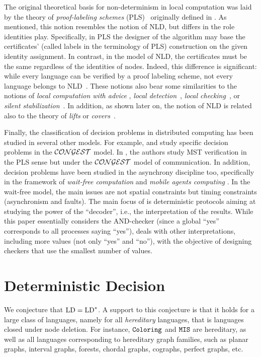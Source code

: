 \documentclass{llncs}
\newcommand{\LD}{\mbox{\rm LD}}
\newcommand{\coloring}{\mbox{\tt Coloring}}
\newcommand{\mis}{\mbox{\tt MIS}}
\begin{document}
The original theoretical basis for non-determinism in local
computation was laid by the theory of \emph{proof-labeling schemes} (PLS)~\cite{GS11,KK07,KKM11,KKP10} 
originally defined in \cite{KKP10}. As mentioned, 
this notion resembles the notion of NLD, but differs in the role identities play. Specifically, in PLS the designer of the algorithm may base the certificates'
(called labels in the terminology of PLS) construction on the given identity assignment. In contrast, in the model of NLD, the certificates must be the same regardless of the identities of nodes.
Indeed, this difference is significant: while every language can be verified by a proof labeling scheme, not every language belongs to NLD~\cite{FKP11}. These notions also bear some similarities to the notions of \emph{local computation with advice} \cite{DP12,FGIP07,FIP10,FKL07}, 
{\em local detection}~\cite{AKY97},
{\em local checking}~\cite{APV}, or {\em silent stabilization}~\cite{silent}.
In addition, as shown later on, the notion of NLD is related also to the theory of
{\em lifts} or {\em covers}~\cite{A80,Linial01}.

Finally, the classification of decision problems in distributed
computing has been studied in several other models. For example,
\cite{DHKKNPPW} and \cite{KKP11} study specific decision problems in
the $\cal{CONGEST}$ model. In \cite{KKM11}, the authors study MST verification in the PLS sense but under the  $\cal{CONGEST}$ model of communication. 
In addition, decision problems have been studied in the asynchrony discipline
too, specifically in the framework of {\em wait-free computation}
\cite{FRT11,FRT12} and {\em mobile agents  computing} \cite{FP12}.
In the wait-free model, the main issues are not spatial constraints but timing
constraints (asynchronism and faults). The main focus of  \cite{FRT12} is
deterministic protocols aiming at studying the power of the ``decoder'',
i.e., the interpretation of the results. While this paper essentially
considers the AND-checker (since a global ``yes'' corresponds to all processes
saying ``yes''), \cite{FRT12} deals with other interpretations,
including more values (not only ``yes'' and ``no''), with the objective of
designing checkers that use the smallest number of values.

\section{Deterministic Decision}
\label{sec:dd}


We conjecture that $\LD=\LD^*$. A support to this conjecture is that it holds for a large class of languages, namely for all \emph{hereditary} languages, that is languages closed under node deletion. For instance, $\coloring$ and $\mis$ are hereditary, as well as all languages corresponding to hereditary graph families, such as planar graphs, interval graphs, forests, chordal graphs, cographs, perfect graphs, etc. 
\end{document}
